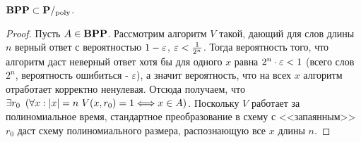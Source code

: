 \begin{theorem}
$\textbf{BPP} \subset \textbf{P}/_{\mathrm{poly}}$.
\end{theorem}

\begin{proof} Пусть $A \in \textbf{BPP}$. Рассмотрим алгоритм $V$ такой, дающий для слов длины $n$ верный ответ с вероятностью $1 - \varepsilon$, $\varepsilon < \frac{1}{2^n}$. Тогда вероятность того, что алгоритм даст неверный ответ хотя бы для одного $x$ равна $2^n \cdot \varepsilon < 1$ (всего слов $2^n$, вероятность ошибиться - $\varepsilon$), а значит вероятность, что на всех $x$ алгоритм отработает корректно ненулевая. Отсюда получаем, что $\exists r_0 \ \left({\forall x: |x| = n \ V(x, r_0) = 1 \Longleftrightarrow x \in A}\right)$. Поскольку $V$ работает за полиномиальное время, стандартное преобразование в схему с <<запаянным>> $r_0$ даст схему полиномиального размера, распознающую все $x$ длины $n$.

\end{proof}